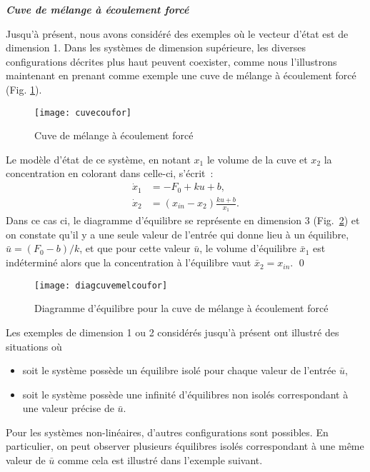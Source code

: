 \begin{exemple}{\bf{\em Cuve de m\'elange \`a \'ecoulement forc\'e}}

Jusqu'\`a pr\'esent, nous avons consid\'er\'e des exemples où le vecteur d'\'etat est de
dimension 1. Dans les syst\`emes de dimension sup\'erieure, les
diverses configurations d\'ecrites plus haut peuvent coexister, comme nous l'illustrons
maintenant en prenant comme exemple une cuve de m\'elange \`a
\'ecoulement forc\'e (Fig. \ref{fig:cuvecoufor}).
\begin{figure}[ht]
\begin{center}
\texttt{[image: cuvecoufor]}
\caption{Cuve de m\'elange \`a \'ecoulement forc\'e}
\label{fig:cuvecoufor}
\end{center} 
\end{figure}
Le mod\`ele d'\'etat de ce
syst\`eme, en notant $x_1$ le volume de la cuve et $x_2$
la concentration en colorant dans celle-ci, s'\'ecrit~:
\begin{equation*} \begin{split}
\dot x_1&= -F_0+k u+b,\\
\dot x_2&=(x_{in}-x_2)\frac{k u+b}{x_1}.
\end{split} \end{equation*}
Dans ce cas ci, le diagramme d'\'equilibre se repr\'esente en dimension 
3 (Fig.~\ref{fig:diagcuvemelcoufor}) et on constate qu'il y a une seule valeur de l'entr\'ee
qui donne lieu \`a un \'equilibre, $\bar u=(F_0-b)/k$, et que pour
cette valeur $\bar u$, le volume d'\'equilibre $\bar x_1$ est
ind\'etermin\'e alors que la concentration \`a l'\'equilibre vaut
$\bar x_2=x_{in}$. \qed
\begin{figure}[h]
\begin{center}
\texttt{[image: diagcuvemelcoufor]}
\caption{Diagramme d'\'equilibre pour la cuve de m\'elange \`a
\'ecoulement forc\'e}
\label{fig:diagcuvemelcoufor}
\end{center} 
\end{figure}
\end{exemple}

Les exemples de dimension 1 ou 2 consid\'er\'es jusqu'\`a pr\'esent
ont illustr\'e des situations o\`u
\begin{itemize}
\item soit le syst\`eme poss\`ede un \'equilibre isol\'e pour
chaque valeur de l'entr\'ee $\bar u$,
\item soit le syst\`eme poss\`ede une infinit\'e d'\'equilibres
non isol\'es correspondant \`a une valeur pr\'ecise de $\bar u$.
\end{itemize}
Pour les syst\`emes non-lin\'eaires, d'autres configurations
sont possibles. En particulier, on peut observer plusieurs
\'equilibres isol\'es correspondant \`a une m\^eme valeur de $\bar u$ comme
cela est illustr\'e dans l'exemple suivant.

